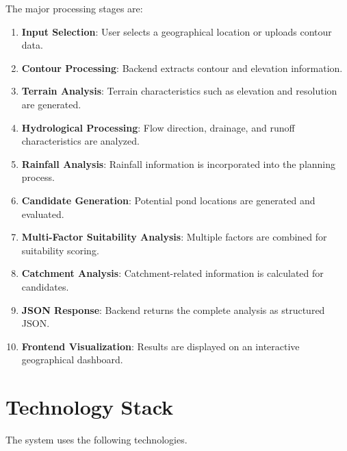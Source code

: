 \documentclass[12pt,a4paper]{article}
\begin{document}
The major processing stages are:

\begin{enumerate}
    \item \textbf{Input Selection}: User selects a geographical location or uploads contour data.
    \item \textbf{Contour Processing}: Backend extracts contour and elevation information.
    \item \textbf{Terrain Analysis}: Terrain characteristics such as elevation and resolution are generated.
    \item \textbf{Hydrological Processing}: Flow direction, drainage, and runoff characteristics are analyzed.
    \item \textbf{Rainfall Analysis}: Rainfall information is incorporated into the planning process.
    \item \textbf{Candidate Generation}: Potential pond locations are generated and evaluated.
    \item \textbf{Multi-Factor Suitability Analysis}: Multiple factors are combined for suitability scoring.
    \item \textbf{Catchment Analysis}: Catchment-related information is calculated for candidates.
    \item \textbf{JSON Response}: Backend returns the complete analysis as structured JSON.
    \item \textbf{Frontend Visualization}: Results are displayed on an interactive geographical dashboard.
\end{enumerate}

\section{Technology Stack}

The system uses the following technologies.
\end{document}
